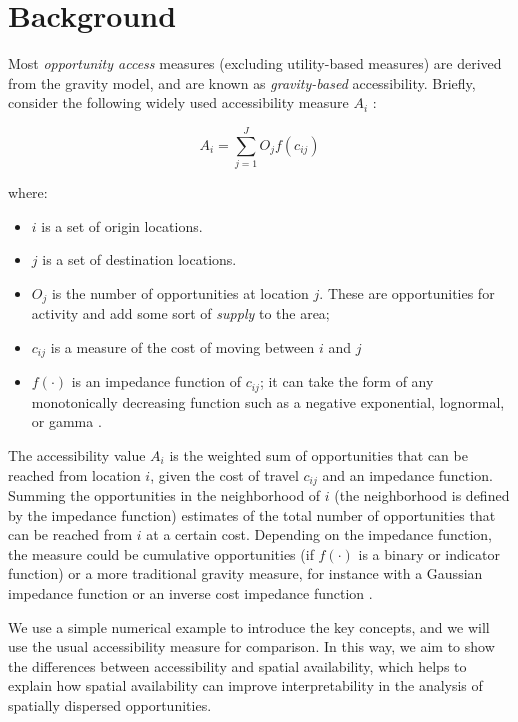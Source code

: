 \documentclass[]{elsarticle} %
\providecommand{\tightlist}{%
  \setlength{\itemsep}{0pt}\setlength{\parskip}{0pt}}
\begin{document}
\hypertarget{background}{%
\section{Background}\label{background}}

Most \emph{opportunity access} measures (excluding utility-based
measures) are derived from the gravity model, and are known as
\emph{gravity-based} accessibility. Briefly, consider the following
widely used accessibility measure \(A_i\) :

\[
A_i = \sum_{j=1}^JO_jf(c_{ij})
\]

\noindent where:

\begin{itemize}
\tightlist
\item
  \(i\) is a set of origin locations.
\item
  \(j\) is a set of destination locations.
\item
  \(O_j\) is the number of opportunities at location \(j\). These are
  opportunities for activity and add some sort of \emph{supply} to the
  area;
\item
  \(c_{ij}\) is a measure of the cost of moving between \(i\) and \(j\)
\item
  \(f(\cdot)\) is an impedance function of \(c_{ij}\); it can take the
  form of any monotonically decreasing function such as a negative
  exponential, lognormal, or gamma .
\end{itemize}

The accessibility value \(A_i\) is the weighted sum of opportunities
that can be reached from location \(i\), given the cost of travel
\(c_{ij}\) and an impedance function. Summing the opportunities in the
neighborhood of \(i\) (the neighborhood is defined by the impedance
function) estimates of the total number of opportunities that can be
reached from \(i\) at a certain cost. Depending on the impedance
function, the measure could be cumulative opportunities (if \(f(\cdot)\)
is a binary or indicator function) or a more traditional gravity
measure, for instance with a Gaussian impedance function or an inverse
cost impedance function .

We use a simple numerical example to introduce the key concepts, and we
will use the usual accessibility measure for comparison. In this way, we
aim to show the differences between accessibility and spatial
availability, which helps to explain how spatial availability can
improve interpretability in the analysis of spatially dispersed
opportunities.
\end{document}
